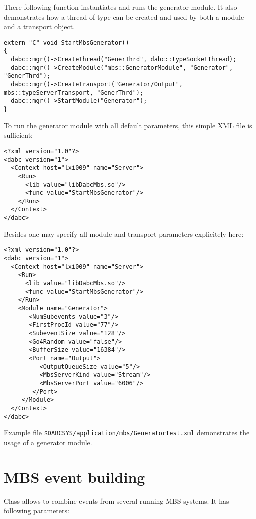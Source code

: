 There following function  instantiates and runs 
the generator module.
It also demonstrates how a thread of type  can be created
and used by both a module and a transport object. 
\begin{small}
\begin{verbatim}
extern "C" void StartMbsGenerator()
{
  dabc::mgr()->CreateThread("GenerThrd", dabc::typeSocketThread);
  dabc::mgr()->CreateModule("mbs::GeneratorModule", "Generator", "GenerThrd");
  dabc::mgr()->CreateTransport("Generator/Output", mbs::typeServerTransport, "GenerThrd");
  dabc::mgr()->StartModule("Generator");
}
\end{verbatim}
\end{small}

To run the generator module with all default parameters, 
this simple XML file is sufficient:   
\begin{small}
\begin{verbatim}
<?xml version="1.0"?>
<dabc version="1">
  <Context host="lxi009" name="Server">
    <Run>
      <lib value="libDabcMbs.so"/>
      <func value="StartMbsGenerator"/>
    </Run>
  </Context>
</dabc>
\end{verbatim}
\end{small}

Besides one may specify all module and transport parameters explicitely here:
\begin{small}
\begin{verbatim}
<?xml version="1.0"?>
<dabc version="1">
  <Context host="lxi009" name="Server">
    <Run>
      <lib value="libDabcMbs.so"/>
      <func value="StartMbsGenerator"/>
    </Run>
    <Module name="Generator">
       <NumSubevents value="3"/>
       <FirstProcId value="77"/>
       <SubeventSize value="128"/>
       <Go4Random value="false"/>
       <BufferSize value="16384"/>
       <Port name="Output">
          <OutputQueueSize value="5"/>
          <MbsServerKind value="Stream"/>
          <MbsServerPort value="6006"/>
        </Port>
     </Module>
  </Context>
</dabc>
\end{verbatim}
\end{small}

Example file {\tt \$DABCSYS/application/mbs/GeneratorTest.xml}  
demonstrates the usage of a generator module. 


\section{MBS event building}
Class  allows to combine events from
several running MBS systems. It has following parameters:

